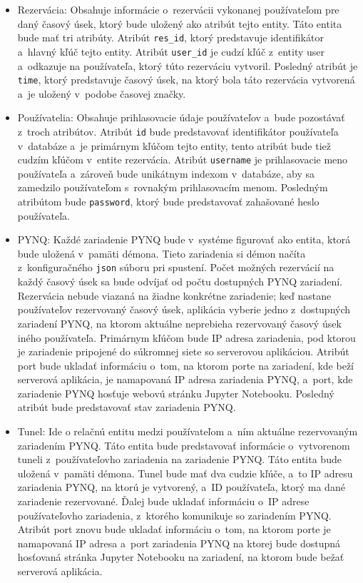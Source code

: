 \begin{itemize}
    \item Rezervácia: Obsahuje informácie o~rezervácii vykonanej používateľom pre daný časový úsek, ktorý bude uložený ako atribút tejto entity. Táto entita bude mať tri atribúty. Atribút \verb|res_id|, ktorý predstavuje identifikátor a~hlavný kľúč tejto entity. Atribút \verb|user_id| je cudzí kľúč z~entity user a~odkazuje na používateľa, ktorý túto rezerváciu vytvoril. Posledný atribút je \verb|time|, ktorý predstavuje časový úsek, na ktorý bola táto rezervácia vytvorená a~je uložený v~podobe časovej značky.
    \item Používatelia: Obsahuje prihlasovacie údaje používateľov a~bude pozostávať z~troch atribútov. Atribút \verb|id| bude predstavovať identifikátor používateľa v~databáze a~je primárnym kľúčom tejto entity, tento atribút bude tiež cudzím kľúčom v~entite rezervácia. Atribút \verb|username| je prihlasovacie meno používateľa a~zároveň bude unikátnym indexom v~databáze, aby sa zamedzilo používateľom s~rovnakým prihlasovacím menom. Posledným atribútom bude \verb|password|, ktorý bude predstavovať zahašované heslo používateľa.
    \item PYNQ: Každé zariadenie PYNQ bude v~systéme figurovať ako entita, ktorá bude uložená v~pamäti démona. Tieto zariadenia si démon načíta z~konfiguračného \verb|json| súboru pri spustení. Počet možných rezervácií na každý časový úsek sa bude odvíjať od počtu dostupných PYNQ zariadení. Rezervácia nebude viazaná na žiadne konkrétne zariadenie; keď nastane používateľov rezervovaný časový úsek, aplikácia vyberie jedno z~dostupných zariadení PYNQ, na ktorom aktuálne neprebieha rezervovaný časový úsek iného používateľa. Primárnym kľúčom bude IP adresa zariadenia, pod ktorou je zariadenie pripojené do súkromnej siete so serverovou aplikáciou. Atribút port bude ukladať informáciu o~tom, na ktorom porte na zariadení, kde beží serverová aplikácia, je namapovaná IP adresa zariadenia PYNQ, a~port, kde zariadenie PYNQ hosťuje webovú stránku Jupyter Notebooku. Posledný atribút bude predstavovať stav zariadenia PYNQ.  
    \item Tunel: Ide o relačnú entitu medzi používateľom a~ním aktuálne rezervovaným zariadením PYNQ. Táto entita bude predstavovať informácie o~vytvorenom tuneli z~používateľovho zariadenia na zariadenie PYNQ. Táto entita bude uložená v~pamäti démona. Tunel bude mať dva cudzie kľúče, a~to IP adresu zariadenia PYNQ, na ktorú je vytvorený, a~ID používateľa, ktorý ma dané zariadenie rezervované. Ďalej bude ukladať informáciu o~IP adrese používateľovho zariadenia, z~ktorého komunikuje so zariadením PYNQ. Atribút port znovu bude ukladať informáciu o~tom, na ktorom porte je namapovaná IP adresa a~port zariadenia PYNQ na ktorej bude dostupná hosťovaná stránka Jupyter Notebooku na zariadení, na ktorom bude bežať serverová aplikácia. 
\end{itemize}

